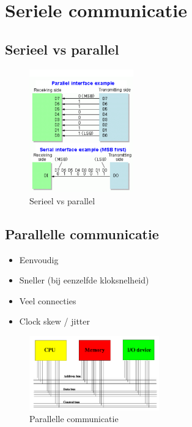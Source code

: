 \documentclass{article}
\begin{document}
\section{Seriele communicatie}
\subsection{Serieel vs parallel}

\begin{figure}[H]
    \centering
    \includegraphics[width=0.4\textwidth]{Screenshot_20200323_114507.png}
    \caption{Serieel vs parallel}
\end{figure}

\subsection{Parallelle communicatie}
\begin{itemize}
    \item Eenvoudig
    \item Sneller (bij eenzelfde kloksnelheid)
    \item Veel connecties
    \item Clock skew / jitter
\end{itemize}

\begin{figure}[H]
    \centering
    \includegraphics[width=0.5\textwidth]{Screenshot_20200323_114732.png}
    \caption{Parallelle communicatie}
\end{figure}
\end{document}
